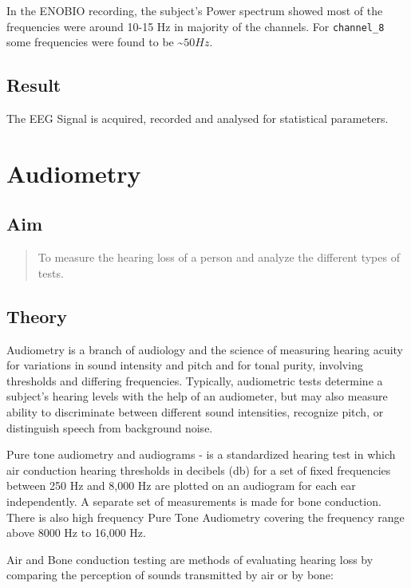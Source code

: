 \documentclass[
  11pt,
  letterpaper,
  DIV=11,
  numbers=noendperiod]{scrreprt}
\begin{document}
In the ENOBIO recording, the subject's Power spectrum showed most of the
frequencies were around 10-15 Hz in majority of the channels. For
\texttt{channel\_8} some frequencies were found to be
\textasciitilde{}\(50Hz\).

\section{Result}\label{result-3}

The EEG Signal is acquired, recorded and analysed for statistical
parameters.


\chapter{Audiometry}\label{audiometry}

\section{Aim}\label{aim-4}

\begin{quote}
To measure the hearing loss of a person and analyze the different types
of tests.
\end{quote}

\section{Theory}\label{theory-4}

Audiometry is a branch of audiology and the science of measuring hearing
acuity for variations in sound intensity and pitch and for tonal purity,
involving thresholds and differing frequencies. Typically, audiometric
tests determine a subject's hearing levels with the help of an
audiometer, but may also measure ability to discriminate between
different sound intensities, recognize pitch, or distinguish speech from
background noise.

Pure tone audiometry and audiograms - is a standardized hearing test in
which air conduction hearing thresholds in decibels (db) for a set of
fixed frequencies between 250 Hz and 8,000 Hz are plotted on an
audiogram for each ear independently. A separate set of measurements is
made for bone conduction. There is also high frequency Pure Tone
Audiometry covering the frequency range above 8000 Hz to 16,000 Hz.

Air and Bone conduction testing are methods of evaluating hearing loss
by comparing the perception of sounds transmitted by air or by bone:
\end{document}
